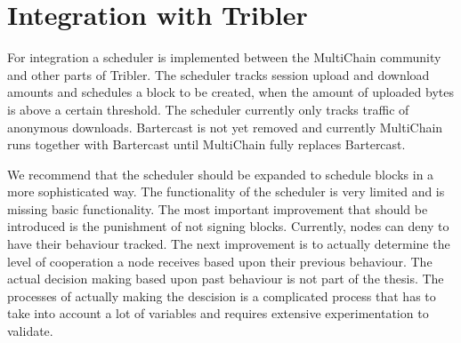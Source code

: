 \section{Integration with Tribler}
For integration a scheduler is implemented between the MultiChain community
and other parts of Tribler.
The scheduler tracks session upload and download amounts and schedules a block to be created,
when the amount of uploaded bytes is above a certain threshold.
The scheduler currently only tracks traffic of anonymous downloads.
Bartercast is not yet removed and
currently MultiChain runs together with Bartercast until MultiChain fully replaces Bartercast.

We recommend that the scheduler should be expanded to schedule blocks in a more sophisticated way.
The functionality of the scheduler is very limited and is missing basic functionality.
The most important improvement that should be introduced is the punishment of not signing blocks.
Currently, nodes can deny to have their behaviour tracked.
The next improvement is to actually determine the level of cooperation a node receives based upon their previous behaviour.
The actual decision making based upon past behaviour is not part of the thesis.
The processes of actually making the descision is a complicated process that has to take into account a lot of variables
and requires extensive experimentation to validate.